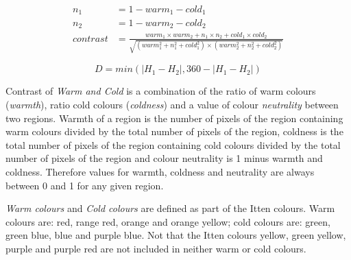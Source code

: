 \documentclass[11pt,a4paper,twoside,openright,draft]{report}
\begin{document}
\begin{multicols}{2}
\begin{figure}[!htb]
\begin{equation}
\begin{aligned}
n_1       &= 1 - warm_1 - cold_1 \\
n_2       &= 1 - warm_2 - cold_2 \\
contrast  &= \frac{ warm_1 \times warm_2
                   + n_1    \times n_2
                   + cold_1 \times cold_2
                  }{ \sqrt{      (warm_1^2 + n_1^2 + cold_1^2)
                          \times (warm_2^2 + n_2^2 + cold_2^2) } }
\label{eq:mach}
\end{aligned}
\end{equation}
\end{figure}

\begin{figure}[!htb]
\begin{equation}
D = min( \lvert H_1 - H_2 \rvert , 360 - \lvert H_1 - H_2 \rvert )
\label{eq:wheel}
\end{equation}
\end{figure}

Contrast of \emph{Warm and Cold} is a combination of the ratio of warm colours
(\emph{warmth}), ratio cold colours (\emph{coldness}) and a value of colour
\emph{neutrality} between two regions.  Warmth of a region is the number of
pixels of the region containing warm colours divided by the total number of
pixels of the region, coldness is the total number of pixels of the region
containing cold colours divided by the total number of pixels of the region and
colour neutrality is 1 minus warmth and coldness.  Therefore values for warmth,
coldness and neutrality are always between 0 and 1 for any given region.

\emph{Warm colours} and \emph{Cold colours} are defined as part of the Itten
colours.  Warm colours are: red, range red, orange and orange yellow; cold
colours are: green, green blue, blue and purple blue.  Not that the Itten
colours yellow, green yellow, purple and purple red are not included in neither
warm or cold colours.


\end{multicols}
\end{document}
